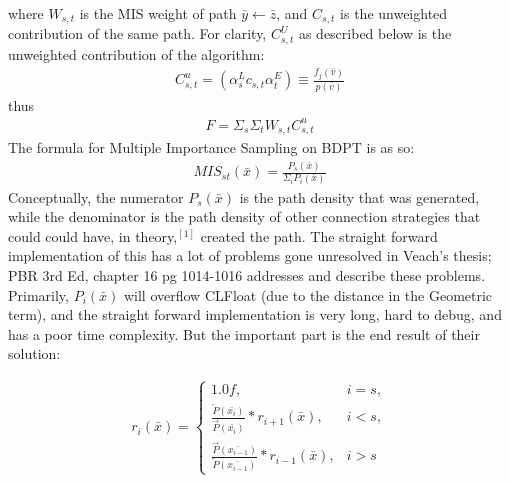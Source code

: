 \message{ !name(test.tex)}\documentclass{article}
\begin{document}
    where $W_{s, t}$ is the MIS weight of path $\bar{y} \leftarrow \bar{z}$, and
    $C_{s, t}$ is the unweighted contribution of the same path. For clarity,
    $C^U_{s, t}$ as described below is the unweighted contribution of the
    algorithm:
  \begin{align}
    C^u_{s, t} = (\alpha^L_s c_{s, t} \alpha^E_t) \equiv
    \frac{f_j(\bar{v})}{p(\bar{v})}
  \end{align}
  thus
  \begin{align}
    F = \Sigma_s\Sigma_tW_{s, t}C^u_{s, t}
  \end{align}
    The formula for Multiple Importance Sampling on BDPT is as so:
  \begin{align}
    MIS_{st}(\bar{x}) = \frac{P_s(\bar{x})}{\Sigma_i{P_i(\bar{x})}} 
  \end{align}
    Conceptually, the numerator $P_s(\bar{x})$ is the path density that was
    generated, while the denominator is the path density of other connection
    strategies that could could have, in theory,$^{[1]}$ created the path. The
    straight forward implementation of this has a lot of problems gone
    unresolved in Veach's thesis; PBR 3rd Ed, chapter 16 pg 1014-1016 addresses
    and describe these problems. Primarily, $P_i(\bar{x})$ will overflow
    CLFloat (due to the distance in the Geometric term), and the straight
    forward implementation is very long, hard to debug, and has a poor time
    complexity. But the important part is the end result of their solution:

  \begin{align}
    r_i (\bar{x}) = 
    \begin{cases}
      1.0f, & i = s,\\
      \frac{\overleftarrow{P}(\bar{x_i})}{\overrightarrow{P}(\bar{x_i})} *
      r_{i+1}(\bar{x}), & i < s,\\
      \frac{\overrightarrow{P}(\bar{x_{i-1}})}{\overleftarrow{P}(\bar{x_{i-1}})}
      * r_{i-1}(\bar{x}), & i > s
    \end{cases}
  \end{align}
\end{document}
